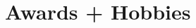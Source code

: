 \documentclass[letterpaper,10pt]{article}
\begin{document}



\section{Awards + Hobbies}
\end{document}
